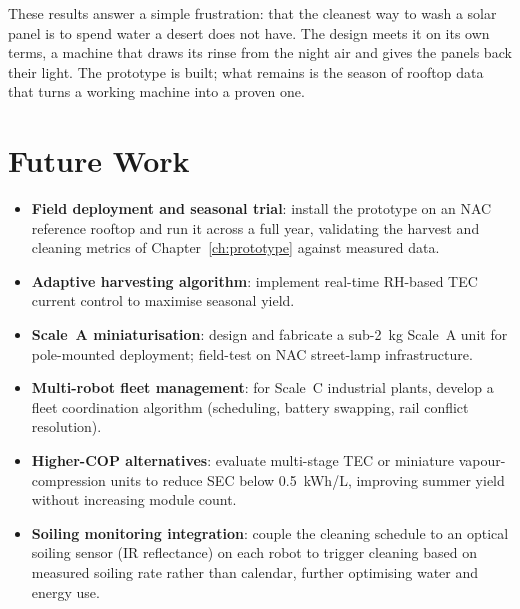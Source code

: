 \documentclass[12pt,a4paper]{report}   %
\begin{document}
These results answer a simple frustration: that the cleanest way to wash a solar panel is to
spend water a desert does not have. The design meets it on its own terms, a machine that draws
its rinse from the night air and gives the panels back their light. The prototype is built; what
remains is the season of rooftop data that turns a working machine into a proven one.

\section{Future Work}

\begin{itemize}[leftmargin=*]
  \item \textbf{Field deployment and seasonal trial}: install the prototype on an NAC reference
  rooftop and run it across a full year, validating the harvest and cleaning metrics of
  Chapter~\ref{ch:prototype} against measured data.
  \item \textbf{Adaptive harvesting algorithm}: implement real-time RH-based TEC current control
  to maximise seasonal yield.
  \item \textbf{Scale~A miniaturisation}: design and fabricate a sub-2~kg Scale~A unit for
  pole-mounted deployment; field-test on NAC street-lamp infrastructure.
  \item \textbf{Multi-robot fleet management}: for Scale~C industrial plants, develop a fleet
  coordination algorithm (scheduling, battery swapping, rail conflict resolution).
  \item \textbf{Higher-COP alternatives}: evaluate multi-stage TEC or miniature vapour-compression
  units to reduce SEC below 0.5~kWh/L, improving summer yield without increasing module count.
  \item \textbf{Soiling monitoring integration}: couple the cleaning schedule to an optical soiling
  sensor (IR reflectance) on each robot to trigger cleaning based on measured soiling rate rather
  than calendar, further optimising water and energy use.
\end{itemize}
\end{document}
